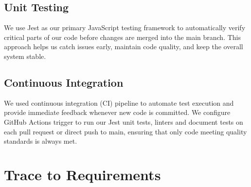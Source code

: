 \documentclass[12pt, titlepage]{article}
\begin{document}
\subsection{Unit Testing}
We use Jest as our primary JavaScript testing framework to automatically verify critical parts 
of our code before changes are merged into the main branch. This approach helps us catch issues 
early, maintain code quality, and keep the overall system stable.

\subsection{Continuous Integration}
We used continuous integration (CI) pipeline to automate test execution
and provide immediate feedback whenever new code is committed. We configure GitHub
Actions trigger to run our Jest unit tests, linters and document tests on each pull request 
or direct push to main, ensuring that only code meeting quality standards is always met.


		
\section{Trace to Requirements}
\end{document}
